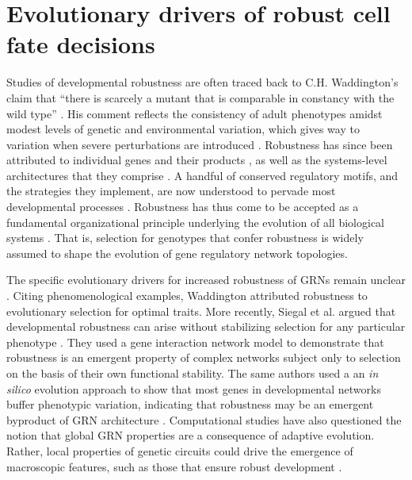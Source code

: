 \section{Evolutionary drivers of robust cell fate decisions}

Studies of developmental robustness are often traced back to C.H. Waddington’s claim that “there is scarcely a mutant that is comparable in constancy with the wild type” \cite{Waddington1942}. His comment reflects the consistency of adult phenotypes amidst modest levels of genetic and environmental variation, which gives way to variation when severe perturbations are introduced \cite{Bateman1959a,Rendel1959,Rendel1966a,Scharloo1991}. Robustness has since been attributed to individual genes and their products \cite{Dun1958,Gibson1996,Rutherford1998}, as well as the systems-level architectures that they comprise \cite{Rutherford1998,Paulsen2011,Li2009b,Eldar2002,Denby2012,Cassidy2013,Cassidy2016a}. A handful of conserved regulatory motifs, and the strategies they implement, are now understood to pervade most developmental processes \cite{Freeman2000,Hartman2001,Alon2007,Marciano2014}. Robustness has thus come to be accepted as a fundamental organizational principle underlying the evolution of all biological systems \cite{Kitano2004,Stelling2004}. That is, selection for genotypes that confer robustness is widely assumed to shape the evolution of gene regulatory network topologies. 

The specific evolutionary drivers for increased robustness of GRNs remain unclear \cite{Siegal2014}. Citing phenomenological examples, Waddington attributed robustness to evolutionary selection for optimal traits. More recently, Siegal et al. argued that developmental robustness can arise without stabilizing selection for any particular phenotype \cite{Siegal2002}. They used a gene interaction network model to demonstrate that robustness is an emergent property of complex networks subject only to selection on the basis of their own functional stability. The same authors used a an \textit{in silico} evolution approach to show that most genes in developmental networks buffer phenotypic variation, indicating that robustness may be an emergent byproduct of GRN architecture \cite{Bergman2003}. Computational studies have also questioned the notion that global GRN properties are a consequence of adaptive evolution. Rather, local properties of genetic circuits could drive the emergence of macroscopic features, such as those that ensure robust development \cite{Lynch2007,Wagner2003}.

